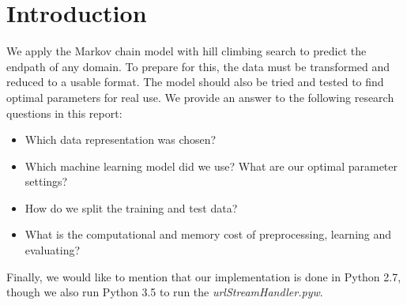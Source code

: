 \section{Introduction}\label{sec:intro}

We apply the Markov chain model with hill climbing search to predict the endpath of any domain. To prepare for this, the data must be transformed and reduced to a usable format. The model should also be tried and tested to find optimal parameters for real use. We provide an answer to the following research questions in this report:
\begin{itemize}
	\item Which data representation was chosen?
	\item Which machine learning model did we use? What are our optimal parameter settings?
	\item How do we split the training and test data?
	\item What is the computational and memory cost of preprocessing, learning and evaluating?
\end{itemize}
Finally, we would like to mention that our implementation is done in Python 2.7, though we also run Python 3.5 to run the \textit{urlStreamHandler.pyw}.